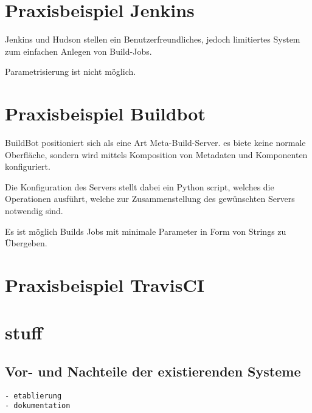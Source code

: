 \section{Praxisbeispiel Jenkins}

Jenkins und Hudson stellen ein Benutzerfreundliches,
jedoch limitiertes System zum einfachen Anlegen von Build-Jobs.

Parametrisierung ist nicht möglich.

\section{Praxisbeispiel Buildbot}

BuildBot positioniert sich als eine Art Meta-Build-Server.
es biete keine normale Oberfläche, sondern wird mittels
Komposition von Metadaten und Komponenten konfiguriert.

Die Konfiguration des Servers stellt dabei ein Python script,
welches die Operationen ausführt, welche zur Zusammenstellung des gewünschten Servers notwendig sind.

Es ist möglich Builds Jobs mit minimale Parameter in Form von Strings zu Übergeben.

\section{Praxisbeispiel TravisCI}

\section{stuff}

\subsection{Vor- und Nachteile der existierenden Systeme}

\begin{verbatim}
- etablierung
- dokumentation
\end{verbatim}


